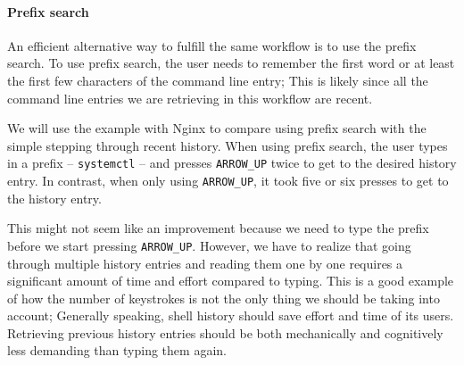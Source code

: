 


\paragraph{Prefix search}

An efficient alternative way to fulfill the same workflow is to use the prefix search. To use prefix search, the user needs to remember the first word or at least the first few characters of the command line entry; This is likely since all the command line entries we are retrieving in this workflow are recent.

We will use the example with Nginx to compare using prefix search with the simple stepping through recent history. When using prefix search, the user types in a prefix -- \verb|systemctl| -- and presses \verb|ARROW_UP| twice to get to the desired history entry. In contrast, when only using \verb|ARROW_UP|, it took five or six presses to get to the history entry.

This might not seem like an improvement because we need to type the prefix before we start pressing \verb|ARROW_UP|. However, we have to realize that going through multiple history entries and reading them one by one requires a significant amount of time and effort compared to typing. 
This is a good example of how the number of keystrokes is not the only thing we should be taking into account; Generally speaking, shell history should save effort and time of its users. Retrieving previous history entries should be both mechanically and cognitively less demanding than typing them again.\cite{greenberg1993computer}



